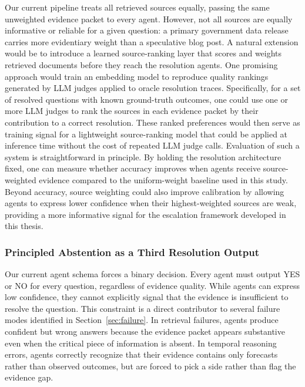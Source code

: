 Our current pipeline treats all retrieved sources equally, passing the same unweighted evidence packet to every agent. However, not all sources are equally informative or reliable for a given question: a primary government data release carries more evidentiary weight than a speculative blog post. A natural extension would be to introduce a learned source-ranking layer that scores and weights retrieved documents before they reach the resolution agents. One promising approach would train an embedding model to reproduce quality rankings generated by LLM judges applied to oracle resolution traces. Specifically, for a set of resolved questions with known ground-truth outcomes, one could use one or more LLM judges to rank the sources in each evidence packet by their contribution to a correct resolution. These ranked preferences would then serve as training signal for a lightweight source-ranking model that could be applied at inference time without the cost of repeated LLM judge calls. Evaluation of such a system is straightforward in principle. By holding the resolution architecture fixed, one can measure whether accuracy improves when agents receive source-weighted evidence compared to the uniform-weight baseline used in this study. Beyond accuracy, source weighting could also improve calibration by allowing agents to express lower confidence when their highest-weighted sources are weak, providing a more informative signal for the escalation framework developed in this thesis.

\subsubsection{Principled Abstention as a Third Resolution Output}

Our current agent schema forces a binary decision. Every agent must output YES or NO for every question, regardless of evidence quality. While agents can express low confidence, they cannot explicitly signal that the evidence is insufficient to resolve the question. This constraint is a direct contributor to several failure modes identified in Section~\ref{sec:failure}. In retrieval failures, agents produce confident but wrong answers because the evidence packet appears substantive even when the critical piece of information is absent. In temporal reasoning errors, agents correctly recognize that their evidence contains only forecasts rather than observed outcomes, but are forced to pick a side rather than flag the evidence gap.

